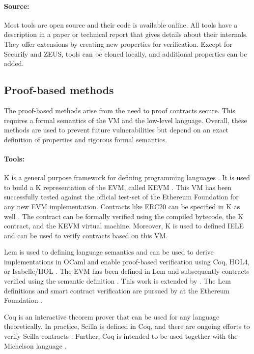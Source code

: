 \paragraph{Source:} Most tools are open source and their code is available online. All tools have a description in a paper or technical report that gives details about their internals. They offer extensions by creating new properties for verification. Except for Securify and ZEUS, tools can be cloned locally, and additional properties can be added.


\subsection{Proof-based methods}
The proof-based methods arise from the need to proof contracts secure. This requires a formal semantics of the VM and the low-level language. Overall, these methods are used to prevent future vulnerabilities but depend on an exact definition of properties and rigorous formal semantics.

\paragraph{Tools:} K is a general purpose framework for defining programming languages \cite{Rosu2007}. It is used to build a K representation of the EVM, called KEVM \cite{Hildenbrandt2017}. This VM has been successfully tested against the official test-set of the Ethereum Foundation for any new EVM implementation. Contracts like ERC20 can be specified in K as well \cite{Park2018}. The contract can be formally verified using the compiled bytecode, the K contract, and the KEVM virtual machine. Moreover, K is used to defined IELE \cite{Kasampalis2018} and can be used to verify contracts based on this VM.

Lem is used to defining language semantics and can be used to derive implementations in OCaml and enable proof-based verification using Coq, HOL4, or Isabelle/HOL \cite{Mulligan2014}. The EVM has been defined in Lem and subsequently contracts verified using the semantic definition \cite{Hirai2017}. This work is extended by \cite{Amani2018}. The Lem definitions and smart contract verification are pursued by \citeauthor{Hirai2018} at the Ethereum Foundation \cite{Hirai2018}.

Coq is an interactive theorem prover that can be used for any language theoretically. In practice, Scilla is defined in Coq, and there are ongoing efforts to verify Scilla contracts \cite{Sergey2018}. Further, Coq is intended to be used together with the Michelson language \cite{DynamicLedgerSolutions2017}.

